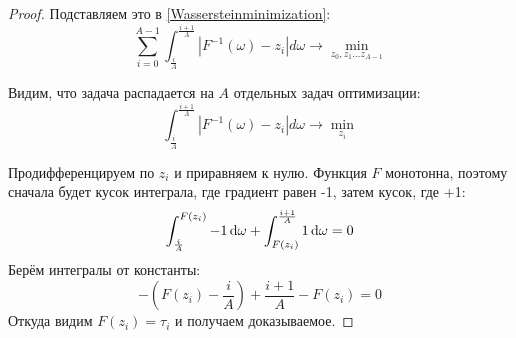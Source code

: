 \begin{theorem}
\begin{proof}
Подставляем это в \eqref{Wassersteinminimization}:
\begin{equation*}
\sum_{i = 0}^{A - 1} \int_{\frac{i}{A}}^{\frac{i + 1}{A}} \left| F^{-1}(\omega) - z_i \right| d\omega \to \min_{z_0, z_1 \dots z_{A-1}}
\end{equation*}

Видим, что задача распадается на $A$ отдельных задач оптимизации:
\begin{equation}\label{w1minim}
\int_{\frac{i}{A}}^{\frac{i + 1}{A}} \left| F^{-1}(\omega) - z_i \right| d\omega \to \min_{z_i}
\end{equation}

Продифференцируем по $z_i$ и приравняем к нулю. Функция $F$ монотонна, поэтому сначала будет кусок интеграла, где градиент равен -1, затем кусок, где +1:
\begin{equation*}
\int_{\frac{i}{A}}^{F(z_i)} -1 \mathop{}\!\mathrm{d} \omega + \int_{F(z_i)}^{\frac{i+1}{A}} 1 \mathop{}\!\mathrm{d} \omega = 0
\end{equation*}
Берём интегралы от константы:
\begin{equation*}
-\left( F(z_i) - \frac{i}{A} \right) + \frac{i+1}{A} - F(z_i) = 0
\end{equation*}
Откуда видим $F(z_i) = \tau_i$ и получаем доказываемое.
\end{proof}
\end{theorem}



